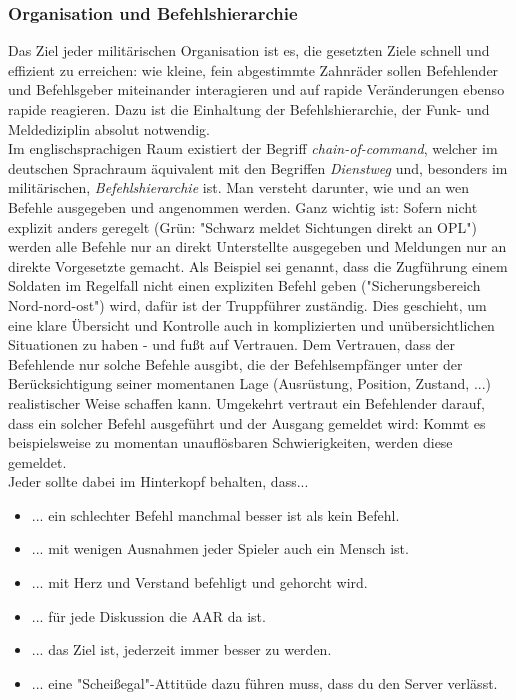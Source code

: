 \subsubsection{Organisation und Befehlshierarchie}
Das Ziel jeder militärischen Organisation ist es, die gesetzten Ziele schnell und effizient zu erreichen: wie kleine, fein abgestimmte Zahnräder sollen Befehlender und Befehlsgeber miteinander interagieren und auf rapide Veränderungen ebenso rapide reagieren. Dazu ist die Einhaltung der Befehlshierarchie, der Funk- und Meldediziplin absolut notwendig.
\\Im englischsprachigen Raum existiert der Begriff \textit{chain-of-command}, welcher im deutschen Sprachraum äquivalent mit den Begriffen \textit{Dienstweg} und, besonders im militärischen, \textit{Befehlshierarchie} ist. Man versteht darunter, wie und an wen Befehle ausgegeben und angenommen werden. Ganz wichtig ist: Sofern nicht explizit anders geregelt (Grün: "Schwarz meldet Sichtungen direkt an OPL") werden alle Befehle nur an direkt Unterstellte ausgegeben und Meldungen nur an direkte Vorgesetzte gemacht. Als Beispiel sei genannt, dass die Zugführung einem Soldaten im Regelfall nicht einen expliziten Befehl geben ("Sicherungsbereich Nord-nord-ost") wird, dafür ist der Truppführer zuständig. Dies geschieht, um eine klare Übersicht und Kontrolle auch in komplizierten und unübersichtlichen Situationen zu haben - und fußt auf Vertrauen. Dem Vertrauen, dass der Befehlende nur solche Befehle ausgibt, die der Befehlsempfänger unter der Berücksichtigung seiner momentanen Lage (Ausrüstung, Position, Zustand, ...) realistischer Weise schaffen kann. Umgekehrt vertraut ein Befehlender darauf, dass ein solcher Befehl ausgeführt und der Ausgang gemeldet wird: Kommt es beispielsweise zu momentan unauflösbaren Schwierigkeiten, werden diese gemeldet.
\\Jeder sollte dabei im Hinterkopf behalten, dass...
\begin{itemize}
	\item ... ein schlechter Befehl manchmal besser ist als kein Befehl.
	\item ... mit wenigen Ausnahmen jeder Spieler auch ein Mensch ist. 
	\item ... mit Herz und Verstand befehligt und gehorcht wird. 
	\item ... für jede Diskussion die AAR da ist.
	\item ... das Ziel ist, jederzeit immer besser zu werden.
	\item ... eine "Scheißegal"-Attitüde dazu führen muss, dass du den Server verlässt.
\end{itemize}
